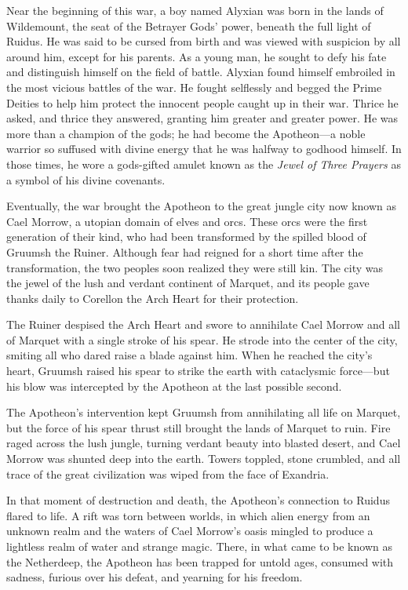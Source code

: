 \documentclass[10pt,a4paper,twoside,bg=print,twocolumn,openany,nodeprecatedcode]{dndbook}
\begin{document}
Near the beginning of this war, a boy named Alyxian was born in the lands of Wildemount, the seat of the Betrayer Gods' power, beneath the full light of Ruidus. He was said to be cursed from birth and was viewed with suspicion by all around him, except for his parents. As a young man, he sought to defy his fate and distinguish himself on the field of battle. Alyxian found himself embroiled in the most vicious battles of the war. He fought selflessly and begged the Prime Deities to help him protect the innocent people caught up in their war. Thrice he asked, and thrice they answered, granting him greater and greater power. He was more than a champion of the gods; he had become the Apotheon—a noble warrior so suffused with divine energy that he was halfway to godhood himself. In those times, he wore a gods-gifted amulet known as the \textit{Jewel of Three Prayers} as a symbol of his divine covenants.

Eventually, the war brought the Apotheon to the great jungle city now known as Cael Morrow, a utopian domain of elves and orcs. These orcs were the first generation of their kind, who had been transformed by the spilled blood of Gruumsh the Ruiner. Although fear had reigned for a short time after the transformation, the two peoples soon realized they were still kin. The city was the jewel of the lush and verdant continent of Marquet, and its people gave thanks daily to Corellon the Arch Heart for their protection.

The Ruiner despised the Arch Heart and swore to annihilate Cael Morrow and all of Marquet with a single stroke of his spear. He strode into the center of the city, smiting all who dared raise a blade against him. When he reached the city's heart, Gruumsh raised his spear to strike the earth with cataclysmic force—but his blow was intercepted by the Apotheon at the last possible second.

The Apotheon's intervention kept Gruumsh from annihilating all life on Marquet, but the force of his spear thrust still brought the lands of Marquet to ruin. Fire raged across the lush jungle, turning verdant beauty into blasted desert, and Cael Morrow was shunted deep into the earth. Towers toppled, stone crumbled, and all trace of the great civilization was wiped from the face of Exandria.

In that moment of destruction and death, the Apotheon's connection to Ruidus flared to life. A rift was torn between worlds, in which alien energy from an unknown realm and the waters of Cael Morrow's oasis mingled to produce a lightless realm of water and strange magic. There, in what came to be known as the Netherdeep, the Apotheon has been trapped for untold ages, consumed with sadness, furious over his defeat, and yearning for his freedom.
\end{document}
